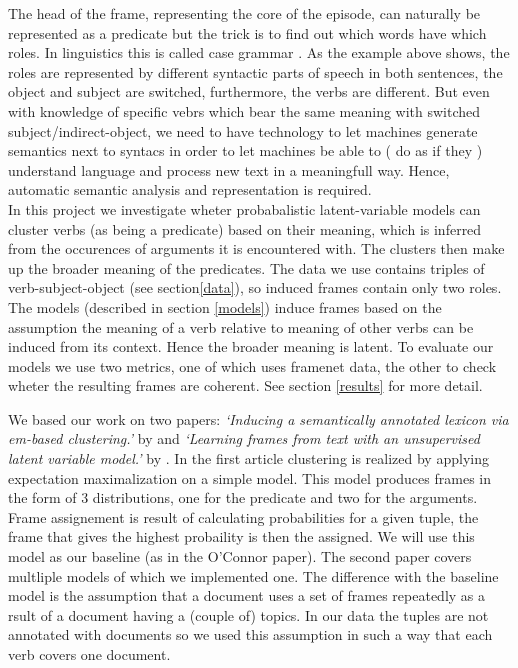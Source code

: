 \documentclass{article} %
\begin{document}
The head of the frame, representing the core of the episode, can naturally be represented as a predicate but the trick is to find out which words have which roles. In linguistics this is called case grammar \citep{dowty1991}. As the example above shows, the roles are represented by different syntactic parts of speech in both sentences, the object and subject are switched, furthermore, the verbs are different. But even with knowledge of specific vebrs which bear the same meaning with switched subject/indirect-object, we need to have technology to let machines generate semantics next to syntacs in order to let machines be able to ( do as if they ) understand language and process new text in a meaningfull way. Hence, automatic semantic analysis and representation is required.\\ 

In this project we investigate wheter probabalistic latent-variable models can cluster verbs (as being a predicate) based on their meaning, which is inferred from the occurences of arguments it is encountered with. The clusters then make up the broader meaning of the predicates. The data we use contains triples of verb-subject-object (see section\ref{data}), so induced frames contain only two roles. The models (described in section \ref{models}) induce frames based on the assumption the meaning of a verb relative to meaning of other verbs can be induced from its context. Hence the broader meaning is latent. To evaluate our models we use two metrics, one of which uses framenet data, the other to check wheter the resulting frames are coherent. See section \ref{results} for more detail.

We based our work on two papers: \textit{`Inducing a semantically annotated lexicon via em-based clustering.'} by \citeauthor{rooth1999} and \textit{`Learning frames from text with an unsupervised latent variable model.'} by \citeauthor{oconnor2013}. In the first article clustering is realized by applying expectation maximalization on a simple model. This model produces frames in the form of 3 distributions, one for the predicate and two for the arguments. Frame assignement is result of calculating  probabilities for a given tuple, the frame that gives the highest probaility is then the assigned. We will use this model as our baseline (as in the O'Connor paper). The second paper covers multliple models of which we implemented one. The difference with the baseline model is the assumption that a document uses a set of frames repeatedly as a rsult of a document having a (couple of) topics. In our data the tuples are not annotated with documents so we used this assumption in such a way that each verb covers one document.  
\end{document}
